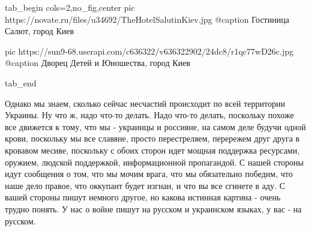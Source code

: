 \ifcmt
  tab_begin cols=2,no_fig,center
		 pic https://novate.ru/files/u34692/TheHotelSalutinKiev.jpg
		 @caption Гостиница Салют, город Киев

		 pic https://sun9-68.userapi.com/c636322/v636322902/24dc8/r1qc77wD26c.jpg
		 @caption Дворец Детей и Юношества, город Киев

  tab_end
\fi

Однако мы знаем, сколько сейчас несчастий происходит по всей территории
Украины. Ну что ж, надо что-то делать. Надо что-то делать, поскольку похоже все
движется к тому, что мы - украинцы и россияне, на самом деле будучи одной
крови, поскольку мы все славяне, просто перестреляем, перережем друг друга в
кровавом месиве, поскольку с обоих сторон идет мощная поддержка ресурсами,
оружием, людской поддержкой, информационной пропагандой. С нашей стороны идут
сообщения о том, что мы мочим врага, что мы обязательно победим, что наше дело
правое, что оккупант будет изгнан, и что вы все сгинете в аду. С вашей стороны
пишут немного другое, но какова истинная картина - очень трудно понять.  У нас
о войне пишут на русском и украинском языках, у вас - на русском.

